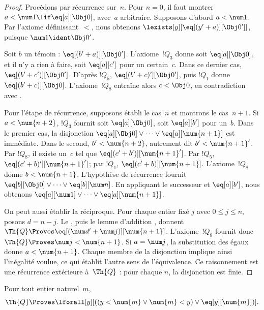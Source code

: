 \documentclass[../../../include/open-logic-section]{subfiles}
\begin{document}
\begin{proof}
Procédons par récurrence sur~$n$. Pour $n=0$, il faut
montrer $a<\num 1\lif\eq[a][\Obj 0]$, avec~$a$
arbitraire. Supposons d'abord $a<\num 1$. Par l'axiome
définissant~$<$, nous obtenons
$\lexists[y][\eq[(y'+a)][\Obj 0']]$, puisque
$\num 1\ident\Obj 0'$.

Soit $b$ un témoin : $\eq[(b'+a)][\Obj 0']$.
L'axiome~$!Q_3$ donne soit $\eq[a][\Obj 0]$, et il n'y a
rien à faire, soit $\eq[a][c']$ pour un certain~$c$. Dans ce
dernier cas, $\eq[(b'+c')][\Obj 0']$. D'après $!Q_5$,
$\eq[(b'+c)'][\Obj 0']$, puis $!Q_1$ donne
$\eq[(b'+c)][\Obj 0]$. L'axiome~$!Q_8$ entraîne alors
$c<\Obj 0$, en contradiction avec .

Pour l'étape de récurrence, supposons établi le cas~$n$ et
montrons le cas~$n+1$. Si $a<\num{n+2}$, $!Q_3$ fournit
soit $\eq[a][\Obj 0]$, soit $\eq[a][b']$ pour un~$b$.
Dans le premier cas, la disjonction
$\eq[a][\Obj 0]\lor\dots\lor\eq[a][\num{n+1}]$
est immédiate. Dans le second, $b'<\num{n+2}$, autrement dit
$b'<\num{n+1}'$. Par $!Q_8$, il existe un~$c$ tel que
$\eq[(c'+b')][\num{n+1}']$. Par $!Q_5$,
$\eq[(c'+b)'][\num{n+1}']$; par $!Q_1$,
$\eq[(c'+b)][\num{n+1}]$. L'axiome~$!Q_8$ donne
$b<\num{n+1}$. L'hypothèse de récurrence fournit
$\eq[b][\Obj 0]\lor\dots\lor\eq[b][\num n]$.
En appliquant le successeur et $\eq[a][b']$, nous obtenons
$\eq[a][\num 1]\lor\dots\lor\eq[a][\num{n+1}]$.

On peut aussi établir la réciproque. Pour chaque entier fixé $j$ avec
$0\leq j\leq n$, posons $d=n-j$. Le
, puis le lemme d'addition
, donnent
$\Th{Q}\Proves\eq[(\num d'+\num j)][\num{n+1}]$.
L'axiome~$!Q_8$ fournit donc
$\Th{Q}\Proves\num j<\num{n+1}$.
Si $a=\num j$, la substitution des égaux donne
$a<\num{n+1}$. Chaque membre de la disjonction implique
ainsi l'inégalité voulue, ce qui établit l'autre sens de
l'équivalence. Ce raisonnement est une récurrence extérieure
à~$\Th{Q}$ : pour chaque $n$, la disjonction est finie.
\end{proof}

\begin{lem}
Pour tout entier naturel~$m$,
\[
  \Th{Q} \Proves
  \lforall[y][((y < \num{m} \lor \num{m} < y) \lor \eq[y][\num{m}])].
\]
\end{lem}
\end{document}
